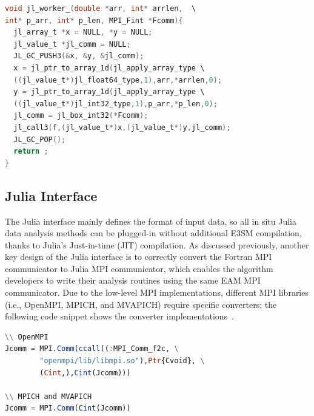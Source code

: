\documentclass{juliacon}
\begin{document}
\begin{minipage}{\linewidth}
\begin{lstlisting}[language = C, caption={C interface worker.}]
void jl_worker_(double *arr, int* arrlen,  \
int* p_arr, int* p_len, MPI_Fint *Fcomm){
  jl_array_t *x = NULL, *y = NULL;
  jl_value_t *jl_comm = NULL;
  JL_GC_PUSH3(&x, &y, &jl_comm);
  x = jl_ptr_to_array_1d(jl_apply_array_type \
  ((jl_value_t*)jl_float64_type,1),arr,*arrlen,0);
  y = jl_ptr_to_array_1d(jl_apply_array_type \
  ((jl_value_t*)jl_int32_type,1),p_arr,*p_len,0);
  jl_comm = jl_box_int32(*Fcomm);
  jl_call3(f,(jl_value_t*)x,(jl_value_t*)y,jl_comm);
  JL_GC_POP();
  return ;
}

\end{lstlisting}
\end{minipage}



\subsection{Julia Interface}

The Julia interface mainly defines the format of input data, so all in situ Julia data analysis methods can be plugged-in without additional E3SM compilation, thanks to Julia's Just-in-time (JIT) compilation.
As discussed previously, another key design of the Julia interface is to correctly convert the Fortran MPI communicator to Julia MPI communicator, which enables the algorithm developers to write their analysis routines using the same EAM MPI communicator. Due to the low-level MPI implementations, different MPI libraries (i.e., OpenMPI, MPICH, and MVAPICH) require specific converters; the following code snippet shows the converter implementations~\cite{gabriel2004open,panda2013mvapich,gropp1996user}.

\begin{minipage}{\linewidth}
\begin{lstlisting}[language = Julia, caption={Juila interface MPI conversion.}]
\\ OpenMPI
Jcomm = MPI.Comm(ccall((:MPI_Comm_f2c, \
        "openmpi/lib/libmpi.so"),Ptr{Cvoid}, \
        (Cint,),Cint(Jcomm)))

\\ MPICH and MVAPICH
Jcomm = MPI.Comm(Cint(Jcomm))
\end{lstlisting}
\end{minipage}
\end{document}
